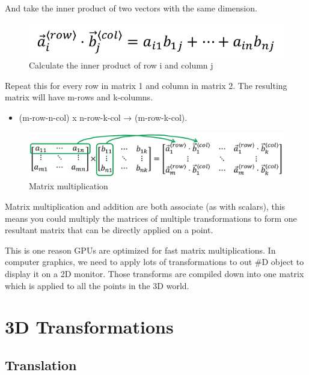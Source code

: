 \documentclass[
]{book}
\providecommand{\tightlist}{%
  \setlength{\itemsep}{0pt}\setlength{\parskip}{0pt}}
\begin{document}
And take the inner product of two vectors with the same dimension.

\begin{figure}
\centering
\includegraphics{img/08-image10.png}
\caption{\label{fig:matrix-inner}Calculate the inner product of row i and column j}
\end{figure}

Repeat this for every row in matrix 1 and column in matrix 2. The resulting matrix will have {m}-rows and {k}-columns.

\begin{itemize}
\tightlist
\item
  ({m}-row-{n}-col) x {n}-row-{k}-col → ({m}-row-{k}-col).
\end{itemize}

\begin{figure}
\centering
\includegraphics{img/08-image11.png}
\caption{\label{fig:matrix-mult}Matrix multiplication}
\end{figure}

Matrix multiplication and addition are both associate (as with scalars), this means you could multiply the matrices of multiple transformations to form one resultant matrix that can be directly applied on a point.

This is one reason GPUs are optimized for fast matrix multiplications. In computer graphics, we need to apply lots of transformations to out \#D object to display it on a 2D monitor. Those transforms are compiled down into one matrix which is applied to all the points in the 3D world.

\hypertarget{d-transformations-1}{%
\section{3D Transformations}\label{d-transformations-1}}

\hypertarget{translation}{%
\subsection{Translation}\label{translation}}
\end{document}
